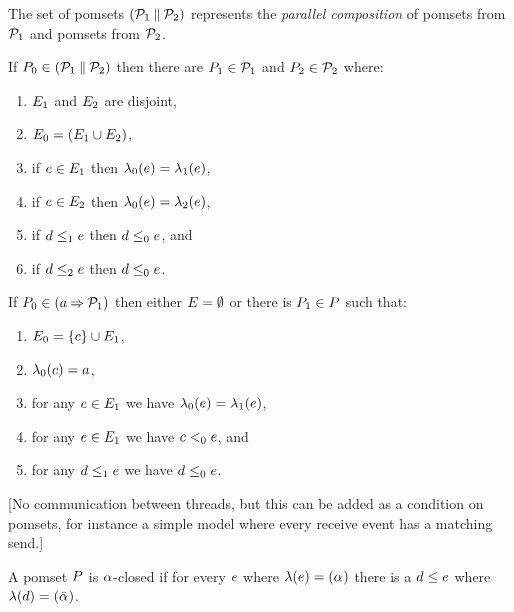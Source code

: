 The set of pomsets $(\mathcal{P}_1\mathbin{\parallel}\mathcal{P}_2)$ represents the \emph{parallel composition} of pomsets from
$\mathcal{P}_1$ and pomsets from $\mathcal{P}_2$.
\begin{definition}
  \label{defn:pomset-par}
  If $P_0 \in (\mathcal{P}_1\mathbin{\parallel}\mathcal{P}_2)$ then
  there are $P_1\in\mathcal{P}_1$ and $P_2\in\mathcal{P}_2$ where:
  \begin{enumerate}
  \item $E_1$ and  $E_2$ are disjoint,
  \item $E_0 = (E_1\cup E_2)$,
  \item if $e\in E_1$ then $\lambda_0(e) = \lambda_1(e)$, 
  \item if $e\in E_2$ then $\lambda_0(e) = \lambda_2(e)$,
  \item if $d\le_1e$ then $d\le_0e$, and
  \item if $d\le_2e$ then $d\le_0e$.
    \setcounter{pomsetParCount}{\value{enumi}}
  \end{enumerate}
\end{definition}

\begin{definition}
  \label{defn:pomset-prefix}
  If $P_0 \in (a\mathbin{\Rightarrow}\mathcal{P}_1)$ then
  either $E=\emptyset$ or there is $P_1\in P$ such that:
  \begin{enumerate}
  \item $E_0=\{c\} \cup E_1$,
  \item $\lambda_0(c) = a$,
  \item for any $e\in E_1$ we have $\lambda_0(e) = \lambda_1(e)$,
  \item for any $e\in E_1$ we have $c<_0e$, and
  \item for any $d\le_1e$ we have $d\le_0e$.
    \setcounter{pomsetPrefixCount}{\value{enumi}}
  \end{enumerate}
\end{definition}

[No communication between threads, but this can be added as a condition on pomsets,
  for instance a simple model where every receive event has a matching send.]

\begin{definition}
  A pomset $P$ is $\alpha$-closed if
  for every $e$ where $\lambda(e)=({\alpha}_{})$
  there is a $d\le e$ where $\lambda(d)=(\bar{\alpha}_{})$.
\end{definition}

